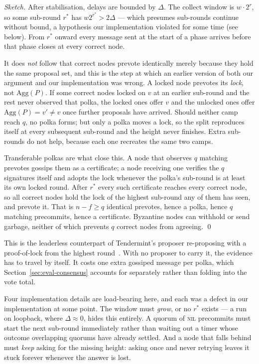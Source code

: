 \documentclass{llncs}
\begin{document}
\begin{proof}[Sketch]
After stabilisation, delays are bounded by $\Delta$. The
collect window is $w \cdot 2^r$, so some sub-round $r^*$ has $w 2^{r^*} >
2\Delta$ --- which presumes sub-rounds continue without bound, a hypothesis our
implementation violated for some time (see below). From $r^*$ onward every
message sent at the start of a phase arrives before that phase closes at every
correct node.

It does \emph{not} follow that correct nodes prevote identically merely because
they hold the same proposal set, and this is the step at which an earlier
version of both our argument and our implementation was wrong. A locked node
prevotes its \emph{lock}, not $\mathrm{Agg}(P)$. If some correct nodes locked on
$v$ at an earlier sub-round and the rest never observed that polka, the locked
ones offer $v$ and the unlocked ones offer $\mathrm{Agg}(P) = v' \neq v$ once
further proposals have arrived. Should neither camp reach $q$, no polka forms;
but only a polka moves a lock, so the split reproduces itself at every
subsequent sub-round and the height never finishes. Extra sub-rounds do not
help, because each one recreates the same two camps.

Transferable polkas are what close this. A node that observes $q$ matching
prevotes gossips them as a certificate; a node receiving one verifies the $q$
signatures itself and adopts the lock whenever the polka's sub-round is at least
its own locked round. After $r^*$ every such certificate reaches every correct
node, so all correct nodes hold the lock of the highest sub-round any of them
has seen, and prevote it. That is $n - f \ge q$ identical prevotes, hence a
polka, hence $q$ matching precommits, hence a certificate. Byzantine nodes can
withhold or send garbage, neither of which prevents $q$ correct nodes from
agreeing. \qed
\end{proof}

This is the leaderless counterpart of Tendermint's proposer re-proposing with a
proof-of-lock from the highest round~\cite{buchman2018tendermint}. With no
proposer to carry it, the evidence has to travel by itself. It costs one extra
gossiped message per polka, which Section~\ref{sec:eval-consensus} accounts for
separately rather than folding into the vote total.

Four implementation details are load-bearing here, and each was a defect in our
implementation at some point. The window must \emph{grow}, or no $r^*$ exists ---
a run on loopback, where $\Delta \approx 0$, hides this entirely. A quorum of
\textsc{nil} precommits must start the next sub-round immediately rather than
waiting out a timer whose outcome overlapping quorums have already settled. And
a node that falls behind must \emph{keep} asking for the missing height: asking
once and never retrying leaves it stuck forever whenever the answer is lost.
\end{document}
